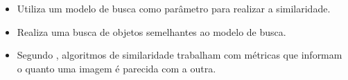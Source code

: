 \begin{itemize}
    \item<1> Utiliza um modelo de busca como parâmetro para realizar a similaridade.
    \item<1> Realiza uma busca de objetos semelhantes ao modelo de busca.
    \item<1> Segundo , algoritmos de similaridade trabalham com métricas que informam o quanto uma imagem é parecida com a outra.
\end{itemize}